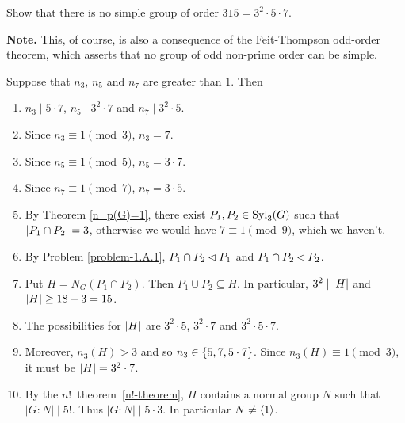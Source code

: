 \begin{probl}
    Show that there is no simple group of order\/ $315 = 3^2\cdot5\cdot7$.

    \textrm{\upshape\textbf{Note.} This, of course, is also a consequence of the Feit-Thompson odd-order theorem, which asserts that no group of odd non-prime order can be simple.}
\end{probl}

\begin{solution} Suppose that $n_3$, $n_5$ and $n_7$ are greater than $1$. Then
\begin{enumerate}[\upshape1.]
    \item $n_3\mid5\cdot7$, $n_5\mid3^2\cdot7$ and $n_7\mid3^2\cdot5$.
    \item Since $n_3\equiv1\pmod3$, $n_3=7$.
    \item Since $n_5\equiv1\pmod5$, $n_5=3\cdot7$.
    \item Since $n_7\equiv1\pmod7$, $n_7=3\cdot5$.
    \item By Theorem \ref{n_p(G)=1}, there exist $P_1,P_2\in{\rm Syl}_3(G)$ such that $\left\vert{P_1\cap P_2}\right\vert=3$, otherwise we would have $7\equiv1\pmod9$, which we haven't.
    \item By Problem \ref{problem-1.A.1}, $P_1\cap P_2\lhd P_1$ and $P_1\cap P_2\lhd P_2$.
    \item Put $H=N_G(P_1\cap P_2)$. Then $P_1\cup P_2\subseteq H$. In particular, $3^2\mid\left\vert{H}\right\vert$ and $\left\vert{H}\right\vert\ge 18-3=15$.
    \item The possibilities for $\left\vert{H}\right\vert$ are $3^2\cdot5$, $3^2\cdot7$ and $3^2\cdot5\cdot7$.
    \item Moreover, $n_3(H)>3$ and so $n_3\in\{5,7,5\cdot7\}$. Since $n_3(H)\equiv1\pmod3$, it must be $\left\vert{H}\right\vert=3^2\cdot7$.
    \item By the $n!$~theorem~\ref{n!-theorem}, $H$ contains a normal group $N$ such that $|G:N|\mid5!$. Thus $|G:N|\mid5\cdot3$. In particular $N\ne\langle1\rangle$.
\end{enumerate}
\end{solution}

